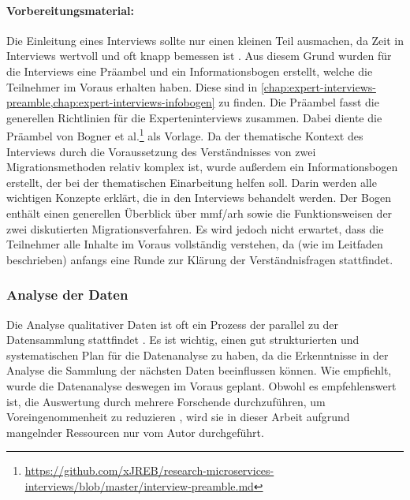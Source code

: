 \paragraph{Vorbereitungsmaterial:}
Die Einleitung eines Interviews sollte nur einen kleinen Teil ausmachen, da Zeit in Interviews wertvoll und oft knapp bemessen ist \cite{Runeson2009,hove-anda-2005,seaman2008qualitative}.
Aus diesem Grund wurden für die Interviews eine Präambel und ein Informationsbogen erstellt, welche die Teilnehmer im Voraus erhalten haben.
Diese sind in \cref{chap:expert-interviews-preamble,chap:expert-interviews-infobogen} zu finden.
Die Präambel fasst die generellen Richtlinien für die Experteninterviews zusammen.
Dabei diente die Präambel von Bogner et al.\footnote{\url{https://github.com/xJREB/research-microservices-interviews/blob/master/interview-preamble.md}} als Vorlage.
Da der thematische Kontext des Interviews durch die Voraussetzung des Verständnisses von zwei Migrationsmethoden relativ komplex ist, wurde außerdem ein Informationsbogen erstellt, der bei der thematischen Einarbeitung helfen soll.
Darin werden alle wichtigen Konzepte erklärt, die in den Interviews behandelt werden.
Der Bogen enthält einen generellen Überblick über  \gls{mmf}/\gls{arh} sowie die Funktionsweisen der zwei diskutierten Migrationsverfahren.
Es wird jedoch nicht erwartet, dass die Teilnehmer alle Inhalte im Voraus vollständig verstehen, da (wie im Leitfaden beschrieben) anfangs eine Runde zur Klärung der Verständnisfragen stattfindet.

\subsubsection{Analyse der Daten}

Die Analyse qualitativer Daten ist oft ein Prozess der parallel zu der Datensammlung stattfindet \cite{Runeson2009}.
Es ist wichtig, einen gut strukturierten und systematischen Plan für die Datenanalyse zu haben, da die Erkenntnisse in der Analyse die Sammlung der nächsten Daten beeinflussen können.
Wie  empfiehlt, wurde die Datenanalyse deswegen im Voraus geplant.
Obwohl es empfehlenswert ist, die Auswertung durch mehrere Forschende durchzuführen, um Voreingenommenheit zu reduzieren \cite{Runeson2009}, wird sie in dieser Arbeit aufgrund mangelnder Ressourcen nur vom Autor durchgeführt.

